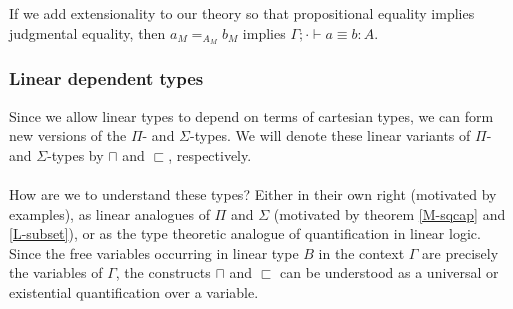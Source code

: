 If we add extensionality to our theory so that propositional equality implies judgmental equality, then $a_M =_{A_M} b_M$ implies $\Gamma; \cdot \vdash a \equiv b : A$.
\subsubsection{Linear dependent types}
Since we allow linear types to depend on terms of cartesian types, we can form new versions of the $\Pi$- and $\Sigma$-types. We will denote these linear variants of $\Pi$- and $\Sigma$-types by $\sqcap$ and $\sqsubset$, respectively.\\
\\
How are we to understand these types? Either in their own right (motivated by examples), as linear analogues of $\Pi$ and $\Sigma$ (motivated by theorem \ref{M-sqcap} and \ref{L-subset}), or as the type theoretic analogue of quantification in linear logic. Since the free variables occurring in linear type $B$ in the context $\Gamma$ are precisely the variables of $\Gamma$, the constructs $\sqcap$ and $\sqsubset$ can be understood as a universal or existential quantification over a variable.
